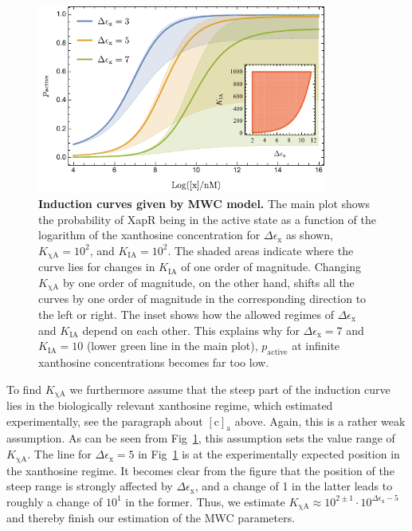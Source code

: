 \documentclass[10pt,letterpaper]{article}
\newcommand{\n}[1]{\mathrm{#1}}
\begin{document}
\begin{figure}
	\centering
	\includegraphics[width=0.85\textwidth]{FigSI3.pdf}
	\caption{{\bf Induction curves given by MWC model.}
	The main plot shows the probability of XapR being in the active state as
	a function of the logarithm of the xanthosine concentration for $\Delta
	\epsilon_{\n{x}}$ as shown, $K_{\n{\chi A}} = 10^{2}$, and $K_{\n{IA}} =
	10^{2}$. The shaded areas indicate where the curve lies for changes in
	$K_{\n{IA}}$ of one order of magnitude. Changing $K_{\n{\chi A}}$ by one
	order of magnitude, on the other hand, shifts all the curves by one
	order of magnitude in the corresponding direction to the left or right.
	The inset shows how the allowed regimes of $\Delta \epsilon_{\n{x}}$ and
	$K_{\n{IA}}$ depend on each other. This explains why for $\Delta
	\epsilon_{\n{x}} = 7$ and $K_{\n{IA}}=10$ (lower green line in the main
	plot), $p_{\n{active}}$ at infinite xanthosine concentrations becomes
	far too low.}
	\label{figS2:induction}
\end{figure}

To find $K_{\n{\chi A}}$ we furthermore assume that the steep part of the
induction curve lies in the biologically relevant xanthosine regime, which
estimated experimentally, see the paragraph about $\n{[c]_a}$ above. Again,
this is a rather weak assumption. As can be seen from
Fig~\ref{figS2:induction}, this assumption sets the value range of
$K_{\n{\chi A}}$. The line for $\Delta \epsilon_{\n{x}} = 5$ in
Fig~\ref{figS2:induction} is at the experimentally expected position in the
xanthosine regime. It becomes clear from the figure that the position of the
steep range is strongly affected by $\Delta \epsilon_{\n{x}}$, and a change
of 1 in the latter leads to roughly a change of $10^1$ in the former. Thus,
we estimate $K_{\n{\chi A}} \approx 10^{2 \pm 1} \cdot 10^{\Delta
\epsilon_{\n{x}}-5}$ and thereby finish our estimation of the MWC
parameters.
\end{document}
